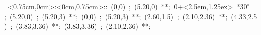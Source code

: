 \hbox{
\xy    <0.75cm,0cm>:<0cm,0.75cm>::
       (0,0) ; (5.20,0) **\dir{-}; 0+<2.5em,1.25ex> *{\hbox{$30^{\circ}$}};
       (5.20,0) ; (5.20,3) **\dir{-}; 
       (0,0) ; (5.20,3) **\dir{-}; 
       (2.60,1.5) ; (2.10,2.36) **\dir{--}; 
       (4.33,2.5) ; (3.83,3.36) **\dir{--}; 
       (3.83,3.36) ; (2.10,2.36) **\dir{--}; 
       \endxy}






